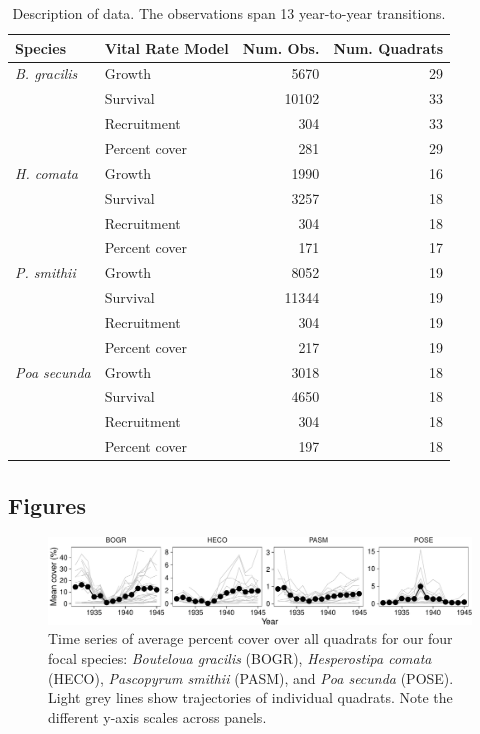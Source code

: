 \documentclass[12pt,]{article}
\begin{document}
\begin{table}[ht]
\centering
\caption{Description of data. The observations span 13 year-to-year transitions.} 
\begin{tabular}{llrr}
  \hline
Species & Vital Rate Model & Num. Obs. & Num. Quadrats\\ 
  \hline
  \emph{B. gracilis} & Growth & 5670 & 29 \\ 
       & Survival & 10102 & 33 \\ 
       & Recruitment & 304 & 33 \\ 
       & Percent cover & 281 & 29 \\ 
  \rule{0pt}{3ex} \emph{H. comata} & Growth & 1990 & 16 \\ 
       & Survival & 3257 & 18 \\ 
       & Recruitment & 304 & 18 \\ 
       & Percent cover & 171 & 17 \\ 
  \rule{0pt}{3ex} \emph{P. smithii} & Growth & 8052 & 19 \\ 
       & Survival & 11344 & 19 \\ 
       & Recruitment & 304 & 19 \\ 
       & Percent cover & 217 & 19 \\ 
  \rule{0pt}{3ex} \emph{Poa secunda} & Growth & 3018 & 18 \\ 
       & Survival & 4650 & 18 \\ 
       & Recruitment & 304 & 18 \\ 
       & Percent cover & 197 & 18 \\ 
   \hline
\end{tabular}
\end{table}

\newpage{}

\subsection{Figures}\label{figures}

\begin{figure}[htbp]
\centering
\includegraphics{components/figure/manuscript-figure_1-1.pdf}
\caption{Time series of average percent cover over all quadrats for our
four focal species: \emph{Bouteloua gracilis} (BOGR), \emph{Hesperostipa
comata} (HECO), \emph{Pascopyrum smithii} (PASM), and \emph{Poa secunda}
(POSE). Light grey lines show trajectories of individual quadrats. Note
the different y-axis scales across panels.}
\end{figure}
\end{document}
